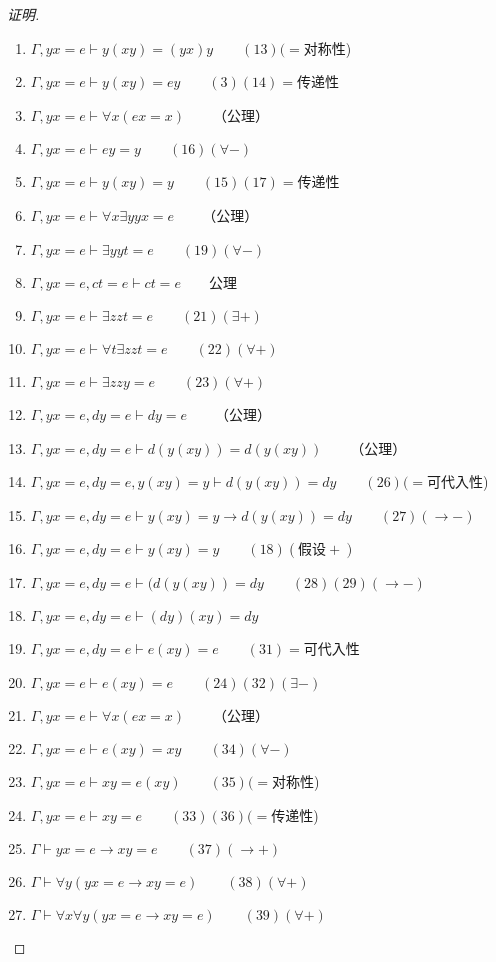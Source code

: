 \documentclass{article}
\begin{document}
\begin{CJK*}{UTF8}{gbsn}
\begin{proof}[证明]
\begin{enumerate}
  \item $\Gamma, yx=e \vdash y(xy)=(yx)y\qquad(13)(=$对称性)
  \item $\Gamma, yx=e \vdash y(xy)=ey\qquad(3)(14)=$传递性
  \item $\Gamma, yx=e \vdash \forall x (ex = x)\qquad$（公理）
  \item $\Gamma, yx=e \vdash ey = y \qquad (16)(\forall -)$
  \item $\Gamma, yx=e \vdash y(xy) = y \qquad (15)(17)=$传递性
  \item $\Gamma, yx=e \vdash \forall x \exists y yx=e\qquad$（公理）
  \item $\Gamma, yx=e \vdash \exists y yt=e\qquad (19)(\forall -)$
  \item $\Gamma, yx=e, ct=e \vdash ct=e\qquad$公理
  \item $\Gamma, yx=e \vdash \exists z zt=e\qquad (21)(\exists +)$
  \item $\Gamma, yx=e \vdash \forall t\exists z zt=e\qquad (22)(\forall +)$
  \item $\Gamma, yx=e \vdash \exists z zy=e\qquad (23)(\forall +)$
  \item $\Gamma, yx=e, dy=e \vdash dy=e\qquad$（公理）
  \item $\Gamma, yx=e, dy=e \vdash d(y(xy))=d(y(xy))\qquad$（公理）
  \item $\Gamma, yx=e, dy=e, y(xy)=y \vdash d(y(xy))=dy\qquad(26)(=$可代入性)
  \item $\Gamma, yx=e, dy=e\vdash y(xy)=y\to d(y(xy))=dy\qquad(27)(\to -)$
  \item $\Gamma, yx=e, dy=e \vdash y(xy) = y \qquad (18)(\text{假设}+)$
  \item $\Gamma, yx=e, dy=e \vdash (d(y(xy))=dy\qquad(28)(29)(\to -)$
  \item $\Gamma, yx=e, dy=e \vdash (dy)(xy)=dy\qquad$
  \item $\Gamma, yx=e, dy=e \vdash e(xy)=e\qquad(31)=$可代入性
  \item $\Gamma, yx=e \vdash e(xy)=e\qquad(24)(32)(\exists -)$
  \item $\Gamma, yx=e\vdash \forall x (ex=x)\qquad$（公理）
  \item $\Gamma, yx=e\vdash e(xy)=xy\qquad(34)(\forall -)$
  \item $\Gamma, yx=e\vdash xy=e(xy)\qquad(35)(=$对称性)
  \item $\Gamma, yx=e\vdash xy=e\qquad(33)(36)(=$传递性)
  \item $\Gamma \vdash yx=e \to xy=e\qquad(37)(\to +)$
  \item $\Gamma \vdash \forall y(yx=e \to xy=e)\qquad(38)(\forall +)$
  \item $\Gamma \vdash \forall x\forall y(yx=e \to xy=e)\qquad(39)(\forall +)$
\end{enumerate}  
\end{proof}


\end{CJK*}
\end{document}

